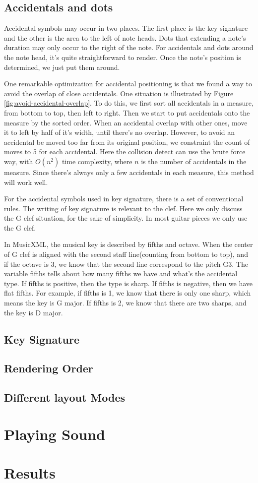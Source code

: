 \subsection{Accidentals and dots}
Accidental symbols may occur in two places. The first place is the key signature and the other is the area to the left of note heads. Dots that extending a note's duration may only occur to the right of the note. For accidentals and dots around the note head, it's quite straightforward to render. Once the note's position is determined, we just put them around. 

One remarkable optimization for accidental positioning is that we found a way to avoid the overlap of close accidentals. One situation is illustrated by Figure \ref{fig:avoid-accidental-overlap}. To do this, we first sort all accidentals in a measure, from bottom to top, then left to right. Then we start to put accidentals onto the measure by the sorted order. When an accidental overlap with other ones, move it to left by half of it's width, until there's no overlap. However, to avoid an accidental be moved too far from its original position, we constraint the count of moves to 5 for each accidental. Here the collision detect can use the brute force way, with $O(n^2)$ time complexity, where $n$ is the number of accidentals in the measure. Since there's always only a few accidentals in each measure, this method will work well.

For the accidental symbols used in key signature, there is a set of conventional rules. The writing of key signature is relevant to the clef. Here we only discuss the G clef situation, for the sake of simplicity. In most guitar pieces we only use the G clef.

In MusicXML, the musical key is described by fifths and octave. When the center of G clef is aligned with the second staff line(counting from bottom to top), and if the octave is 3, we know that the second line correspond to the pitch G3. The variable fifths tells about how many fifths we have and what's the accidental type. If fifths is positive, then the type is sharp. If  fifths is negative, then we have flat fifths. For example, if fifths is 1, we know that there is only one sharp, which means the key is G major. If fifths is 2, we know that there are two sharps, and the key is D major.

\subsection{Key Signature}
\subsection{Rendering Order}
\subsection{Different layout Modes}


\section{Playing Sound}

\section{Results}
